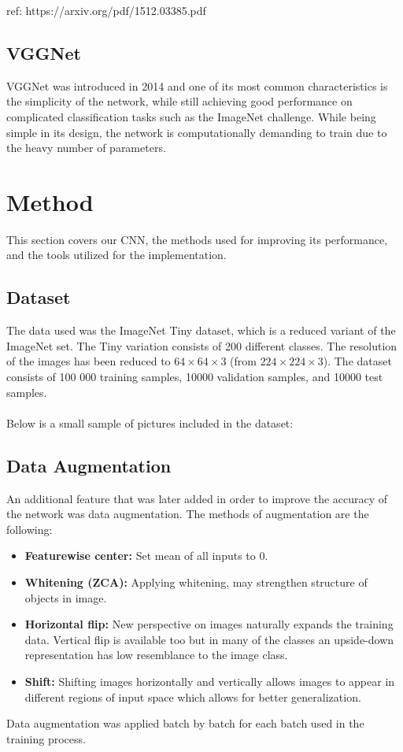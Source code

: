 \documentclass{kthreport}
\begin{document}
ref:
https://arxiv.org/pdf/1512.03385.pdf


\subsection{VGGNet}
VGGNet was introduced in 2014 and one of its most common characteristics is the simplicity of the network, while still achieving good performance on complicated classification tasks such as the ImageNet challenge\cite{simonyan2014very}. While being simple in its design, the network is computationally demanding to train due to the heavy number of parameters.



\section{Method}
This section covers our CNN, the methods used for improving its performance, and the tools utilized for the implementation.

\subsection{Dataset}
The data used was the ImageNet Tiny dataset, which is a reduced variant of the ImageNet set. The Tiny variation consists of 200 different classes. The resolution of the images has been reduced to $64\times64\times3$ (from  $224\times224\times3$). The dataset consists of 100 000 training samples, 10000 validation samples, and 10000 test samples.
\\\\
Below is a small sample of pictures included in the dataset:

\FloatBarrier


\subsection{Data Augmentation}
An additional feature that was later added in order to improve the accuracy of the network was data augmentation. The methods of augmentation are the following:\\
\begin{itemize}
\item \textbf{Featurewise center:} Set mean of all inputs to 0.
\item \textbf{Whitening (ZCA):} Applying whitening, may strengthen structure of objects in image.
\item \textbf{Horizontal flip:} New perspective on images naturally expands the training data. Vertical flip is available too but in many of the classes an upside-down representation has low resemblance to the image class.
\item \textbf{Shift:} Shifting images horizontally and vertically allows images to appear in different regions of input space which allows for better generalization.
\end{itemize}
Data augmentation was applied batch by batch for each batch used in the training process.
\end{document}
